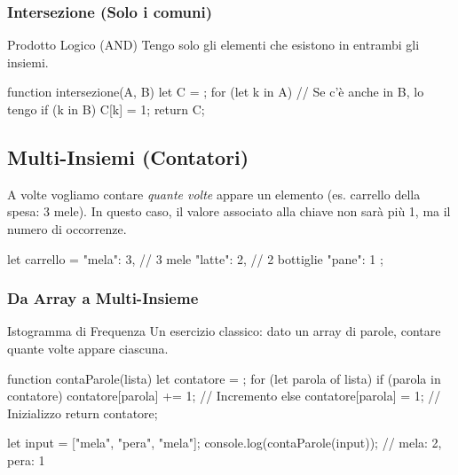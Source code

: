\subsubsection{Intersezione (Solo i comuni)}
\begin{concept}{Prodotto Logico (AND)}
Tengo solo gli elementi che esistono in entrambi gli insiemi.
\end{concept}
\begin{jsbox}
function intersezione(A, B) {
    let C = {};
    for (let k in A) {
        // Se c'è anche in B, lo tengo
        if (k in B) {
            C[k] = 1;
        }
    }
    return C;
}
\end{jsbox}

\subsection{Multi-Insiemi (Contatori)}
A volte vogliamo contare \textit{quante volte} appare un elemento (es. carrello della spesa: 3 mele).
In questo caso, il valore associato alla chiave non sarà più 1, ma il numero di occorrenze.

\begin{jsbox}
let carrello = {
    "mela": 3,  // 3 mele
    "latte": 2, // 2 bottiglie
    "pane": 1
};
\end{jsbox}

\subsubsection{Da Array a Multi-Insieme}
\begin{concept}{Istogramma di Frequenza}
Un esercizio classico: dato un array di parole, contare quante volte appare ciascuna.
\end{concept}
\begin{jsbox}
function contaParole(lista) {
    let contatore = {};
    for (let parola of lista) {
        if (parola in contatore) {
            contatore[parola] += 1; // Incremento
        } else {
            contatore[parola] = 1; // Inizializzo
        }
    }
    return contatore;
}

let input = ["mela", "pera", "mela"];
console.log(contaParole(input)); // { mela: 2, pera: 1 }
\end{jsbox}
